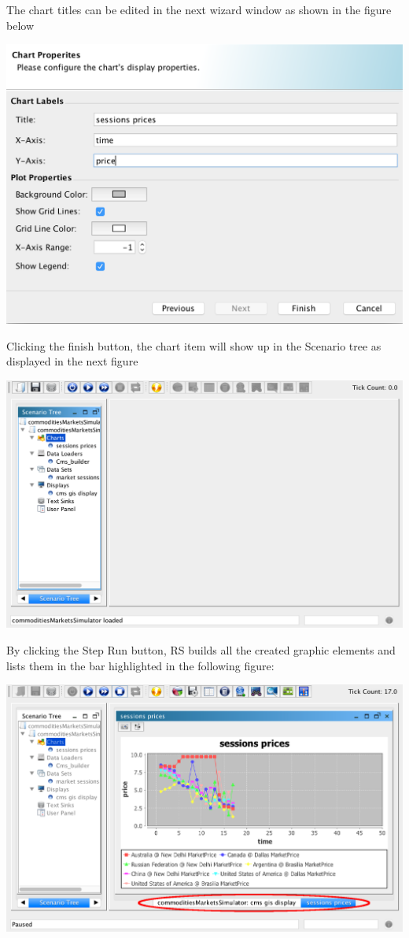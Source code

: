 \documentclass{article}
\begin{document}
The chart titles can be edited in the next wizard window as shown in the figure below

\includegraphics[scale=0.35]{fig_cms_rs_chart3}

Clicking the finish button, the chart item will show up in the Scenario tree as displayed in the next figure

\includegraphics[scale=0.35]{fig_cms_rs_chart4}

By clicking the Step Run button, RS builds all the created graphic elements and lists them in the bar highlighted in the following figure:

\includegraphics[scale=0.35]{fig_cms_rs_chart5}
\end{document}
